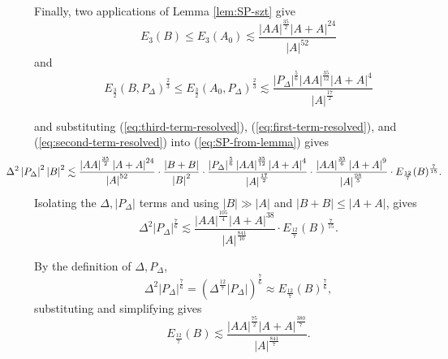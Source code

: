 \documentclass[reqno]{amsart}
\numberwithin{equation}{section}
\begin{document}
Finally, two applications of Lemma \ref{lem:SP-szt} give
\begin{equation} \label{eq:first-term-resolved}
E_3(B) \leq E_3(A_0)\lesssim \frac{\left\lvert AA \right\rvert ^{\frac{35}{2} } \left\lvert A + A \right\rvert ^{24}}{\left\lvert A \right\rvert ^{52}} 
\end{equation}
and
\begin{equation} \label{eq:second-term-resolved}
E_{\frac{3}{2} } (B,P_{\Delta} )^{\frac{2}{3} } \leq E_{\frac{3}{2} } (A_0,P_{\Delta} )^{\frac{2}{3} }\lesssim \frac{\left\lvert P_{\Delta}  \right\rvert ^{\frac{5}{6}  }  \left\lvert AA \right\rvert ^{\frac{35}{12} } \left\lvert A+A \right\rvert ^{4}}{\left\lvert A \right\rvert ^{\frac{17}{2} }} 
\end{equation}

and substituting (\ref{eq:third-term-resolved}), (\ref{eq:first-term-resolved}), and (\ref{eq:second-term-resolved}) into 
(\ref{eq:SP-from-lemma}) gives
\[\hspace*{-10mm}
    \Delta ^{2} \left\lvert P_{\Delta}  \right\rvert ^{2} \left\lvert B \right\rvert ^{2} \lesssim  \frac{\left\lvert AA \right\rvert ^{\frac{35}{2} } \left\lvert A + A \right\rvert ^{24}}{\left\lvert A \right\rvert ^{52}} \cdot \frac{\left\lvert B+B \right\rvert }{\left\lvert B \right\rvert ^{2}} \cdot \frac{\left\lvert P_{\Delta}  \right\rvert ^{\frac{5}{6}  }  \left\lvert AA \right\rvert ^{\frac{35}{12} } \left\lvert A+A \right\rvert ^{4}}{\left\lvert A \right\rvert ^{\frac{17}{2} }} \cdot \frac{\left\lvert AA \right\rvert ^{\frac{35}{6} }\left\lvert A+A \right\rvert ^{9}}{\left\lvert A \right\rvert ^{\frac{98}{5} }} \cdot E_{\frac{12}{7} } (B)^{\frac{7}{15} }
.\]
Isolating the \(\Delta, \left\lvert P_{\Delta}  \right\rvert \) terms and using \(\left\lvert B \right\rvert \gg \left\lvert A \right\rvert \) and \(\left\lvert B + B \right\rvert \leq \left\lvert A + A  \right\rvert \), gives
\[
    \Delta^{2} \left\lvert P_{\Delta}  \right\rvert ^{\frac{7}{6} } \lesssim  \frac{\left\lvert AA \right\rvert ^{\frac{105}{4}} \left\lvert A+A \right\rvert^{38} }{\left\lvert A \right\rvert^{\frac{841}{10} } } \cdot E_{\frac{12}{7} } (B)^{\frac{7}{15} }
.\]

By the definition of \(\Delta,P_{\Delta} \),
\[
    \Delta ^{2}\left\lvert P_{\Delta}  \right\rvert ^{\frac{7}{6} } = \left( \Delta^{\frac{12}{7} } \left\lvert P_{\Delta}  \right\rvert  \right) ^{\frac{7}{6} } \approx E_{\frac{12}{7} } (B) ^{\frac{7}{6} }
,\]
substituting and simplifying gives
\[
    E_{\frac{12}{7} } (B)\lesssim \frac{\left\lvert AA \right\rvert ^{\frac{75}{2} } \left\lvert A+A \right\rvert ^{\frac{380}{7} }}{\left\lvert A \right\rvert ^{\frac{841}{7} }} 
.\]
\end{document}
